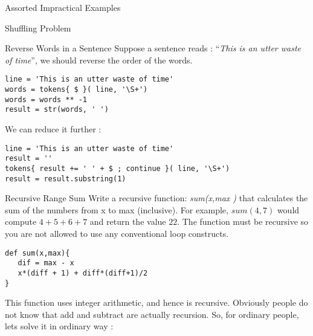 \begin{section}{Assorted Impractical Examples}
\begin{subsection}{Shuffling Problem}
\end{subsection}

\begin{subsection}{Reverse Words in a Sentence}
Suppose a sentence reads : ``\emph{This is an utter waste of time}'', 
we should reverse the order of the words. 

\begin{center}\begin{minipage}{\linewidth}
\begin{lstlisting}[style=JexlStyle]
line = 'This is an utter waste of time'
words = tokens{ $ }( line, '\S+')
words = words ** -1
result = str(words, ' ') 
\end{lstlisting}  
\end{minipage}\end{center}

We can reduce it further :

\begin{center}\begin{minipage}{\linewidth}
\begin{lstlisting}[style=JexlStyle]
line = 'This is an utter waste of time'
result = ''
tokens{ result += ' ' + $ ; continue }( line, '\S+')
result = result.substring(1)
\end{lstlisting}  
\end{minipage}\end{center}

\end{subsection}

\begin{subsection}{Recursive Range Sum}
Write a recursive function: \emph{ sum(x,max ) } 
that calculates the sum of the numbers from x to max (inclusive). 
For example, $sum(4,7)$ would compute $4 + 5 + 6 + 7$ and return the value $22$. 
The function must be recursive so you are not allowed to use any conventional loop constructs.

\begin{center}\begin{minipage}{\linewidth}
\begin{lstlisting}[style=JexlStyle]
def sum(x,max){
   dif = max - x
   x*(diff + 1) + diff*(diff+1)/2  
}
\end{lstlisting}  
\end{minipage}\end{center}
This function uses integer arithmetic, and hence is recursive.
Obviously people do not know that add and subtract are actually recursion.
So, for ordinary people, lets solve it in ordinary way :


\end{subsection}
\end{section}
